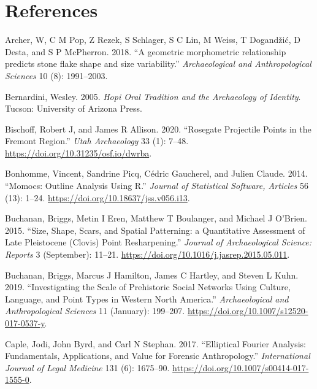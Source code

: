 \documentclass{article}
\newlength{\cslhangindent}
\newlength{\cslentryspacingunit} %
\newenvironment{CSLReferences}[2] %
 {%
  \setlength{\parindent}{0pt}
  \ifodd #1
  \let\oldpar\par
  \def\par{\hangindent=\cslhangindent\oldpar}
  \fi
  \setlength{\parskip}{#2\cslentryspacingunit}
 }%
 {}
\begin{document}
\hypertarget{references}{%
\section*{References}\label{references}}

\hypertarget{refs}{}
\begin{CSLReferences}{1}{0}
\leavevmode{}%
Archer, W, C M Pop, Z Rezek, S Schlager, S C Lin, M Weiss, T Dogandžić,
D Desta, and S P McPherron. 2018. {``{A geometric morphometric
relationship predicts stone flake shape and size variability}.''}
\emph{Archaeological and Anthropological Sciences} 10 (8): 1991--2003.

\leavevmode{}%
Bernardini, Wesley. 2005. \emph{{Hopi Oral Tradition and the Archaeology
of Identity}}. Tucson: University of Arizona Press.

\leavevmode{}%
Bischoff, Robert J, and James R Allison. 2020. {``{Rosegate Projectile
Points in the Fremont Region}.''} \emph{Utah Archaeology} 33 (1): 7--48.
\url{https://doi.org/10.31235/osf.io/dwrba}.

\leavevmode{}%
Bonhomme, Vincent, Sandrine Picq, Cédric Gaucherel, and Julien Claude.
2014. {``{Momocs: Outline Analysis Using R}.''} \emph{Journal of
Statistical Software, Articles} 56 (13): 1--24.
\url{https://doi.org/10.18637/jss.v056.i13}.

\leavevmode{}%
Buchanan, Briggs, Metin I Eren, Matthew T Boulanger, and Michael J
O'Brien. 2015. {``{Size, Shape, Scars, and Spatial Patterning: a
Quantitative Assessment of Late Pleistocene (Clovis) Point
Resharpening}.''} \emph{Journal of Archaeological Science: Reports} 3
(September): 11--21. \url{https://doi.org/10.1016/j.jasrep.2015.05.011}.

\leavevmode{}%
Buchanan, Briggs, Marcus J Hamilton, James C Hartley, and Steven L Kuhn.
2019. {``{Investigating the Scale of Prehistoric Social Networks Using
Culture, Language, and Point Types in Western North America}.''}
\emph{Archaeological and Anthropological Sciences} 11 (January):
199--207. \url{https://doi.org/10.1007/s12520-017-0537-y}.

\leavevmode{}%
Caple, Jodi, John Byrd, and Carl N Stephan. 2017. {``Elliptical Fourier
Analysis: Fundamentals, Applications, and Value for Forensic
Anthropology.''} \emph{International Journal of Legal Medicine} 131 (6):
1675--90. \url{https://doi.org/10.1007/s00414-017-1555-0}.


\end{CSLReferences}
\end{document}
